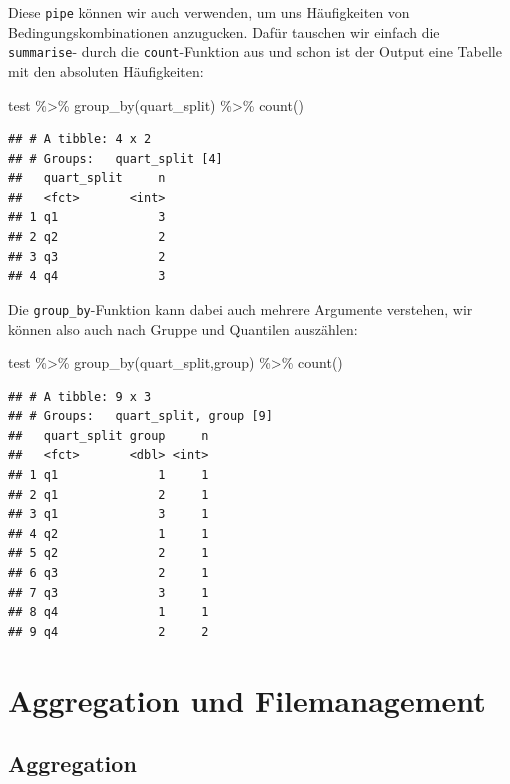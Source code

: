 \documentclass[
]{book}
\newenvironment{Shaded}{\begin{snugshade}}{\end{snugshade}}
\newcommand{\FunctionTok}[1]{\textcolor[rgb]{0.00,0.00,0.00}{#1}}
\newcommand{\NormalTok}[1]{#1}
\newcommand{\SpecialCharTok}[1]{\textcolor[rgb]{0.00,0.00,0.00}{#1}}
\begin{document}
Diese \texttt{pipe} können wir auch verwenden, um uns Häufigkeiten von Bedingungskombinationen anzugucken. Dafür tauschen wir einfach die \texttt{summarise}- durch die \texttt{count}-Funktion aus und schon ist der Output eine Tabelle mit den absoluten Häufigkeiten:

\begin{Shaded}
\begin{Highlighting}[]
\NormalTok{test }\SpecialCharTok{\%\textgreater{}\%} 
  \FunctionTok{group\_by}\NormalTok{(quart\_split) }\SpecialCharTok{\%\textgreater{}\%} 
  \FunctionTok{count}\NormalTok{()}
\end{Highlighting}
\end{Shaded}

\begin{verbatim}
## # A tibble: 4 x 2
## # Groups:   quart_split [4]
##   quart_split     n
##   <fct>       <int>
## 1 q1              3
## 2 q2              2
## 3 q3              2
## 4 q4              3
\end{verbatim}

Die \texttt{group\_by}-Funktion kann dabei auch mehrere Argumente verstehen, wir können also auch nach Gruppe und Quantilen auszählen:

\begin{Shaded}
\begin{Highlighting}[]
\NormalTok{test }\SpecialCharTok{\%\textgreater{}\%} 
  \FunctionTok{group\_by}\NormalTok{(quart\_split,group) }\SpecialCharTok{\%\textgreater{}\%} 
  \FunctionTok{count}\NormalTok{()}
\end{Highlighting}
\end{Shaded}

\begin{verbatim}
## # A tibble: 9 x 3
## # Groups:   quart_split, group [9]
##   quart_split group     n
##   <fct>       <dbl> <int>
## 1 q1              1     1
## 2 q1              2     1
## 3 q1              3     1
## 4 q2              1     1
## 5 q2              2     1
## 6 q3              2     1
## 7 q3              3     1
## 8 q4              1     1
## 9 q4              2     2
\end{verbatim}

\hypertarget{aggregation-und-filemanagement}{%
\chapter{Aggregation und Filemanagement}\label{aggregation-und-filemanagement}}

\hypertarget{aggregation}{%
\section{Aggregation}\label{aggregation}}
\end{document}

